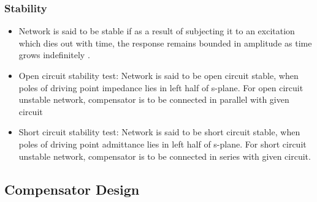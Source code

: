 \documentclass{beamer}
\begin{document}
\begin{frame}
\frametitle{Stability}

\begin{small}
        \begin{itemize}
	\item{Network is said to be stable if as a result of subjecting it to an excitation which dies out with time, the response remains bounded in amplitude as time grows indefinitely \cite{Haykin}.}
\item{Open circuit stability test: Network is said to be open circuit stable, when poles of driving point impedance lies in left half of s-plane. For open circuit unstable network, compensator is to be connected in parallel with given circuit}
\item{Short circuit stability test: Network is said to be short circuit stable, when poles of driving point admittance lies in left half of s-plane. For short circuit unstable network, compensator is to be connected in series with given circuit.}
                \end{itemize}
\end{small}
\let\thefootnote\relax{}	
\end{frame}








\subsection*{Compensator Design}
\end{document}
